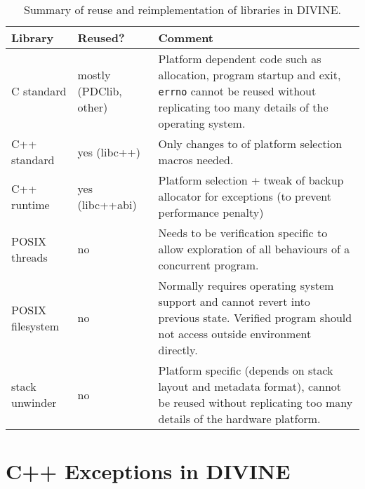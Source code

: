 \begin{table}[t]
  \begin{tabularx}{\textwidth}{>{\raggedright}p{5.5em}p{5.5em}L}
      \toprule
      Library    & Reused? & Comment \\\midrule\midrule
      C standard & mostly (\mbox{PDClib}, other) & Platform dependent code such as allocation, program startup and exit, \texttt{errno} cannot be reused without replicating too many details of the operating system. \\\midrule
      C++ standard & yes (libc++) & Only changes to of platform selection macros needed. \\\midrule
      C++ runtime  & yes (libc++abi) & Platform selection + tweak of backup allocator for exceptions (to prevent performance penalty) \\\midrule
      POSIX threads & no & Needs to be verification specific to allow exploration of all behaviours of a concurrent program. \\\midrule
      POSIX filesystem & no & Normally requires operating system support and cannot revert into previous state. Verified program should not access outside environment directly. \\\midrule
      stack unwinder & no & Platform specific (depends on stack layout and metadata format), cannot be reused without replicating too many details of the hardware platform. \\
      \bottomrule
  \end{tabularx}
  \caption{Summary of reuse and reimplementation of libraries in DIVINE.}\label{tab:lang:reuse}
\end{table}

\section{C++ Exceptions in DIVINE}\label{sec:lang:except}


